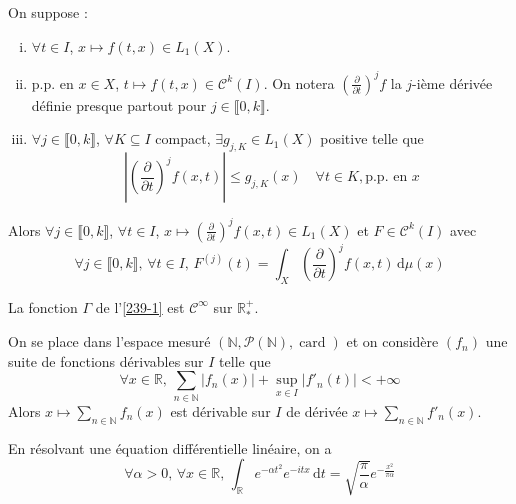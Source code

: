 	\begin{theorem}
		On suppose :
		\begin{enumerate}[(i)]
			\item $\forall t \in I$, $x \mapsto f(t,x) \in L_1(X)$.
			\item p.p. en $x \in X$, $t \mapsto f(t,x) \in \mathcal{C}^k(I)$. On notera $\left(\frac{\partial}{\partial t}\right)^j f$ la $j$-ième dérivée définie presque partout pour $j \in \llbracket 0, k \rrbracket$.
			\item $\forall j \in \llbracket 0, k \rrbracket$, $\forall K \subseteq I$ compact, $\exists g_{j,K} \in L_1(X)$ positive telle que
			\[ \left| \left(\frac{\partial}{\partial t}\right)^j f(x,t) \right| \leq g_{j,K}(x) \quad \forall t \in K, \text{p.p. en } x \]
		\end{enumerate}
		Alors $\forall j \in \llbracket 0, k \rrbracket$, $\forall t \in I$, $x \mapsto \left(\frac{\partial}{\partial t}\right)^j f(x,t) \in L_1(X)$ et $F \in \mathcal{C}^k(I)$ avec
		\[ \forall j \in \llbracket 0, k \rrbracket, \, \forall t \in I, \, F^{(j)}(t) = \int_X \left(\frac{\partial}{\partial t}\right)^j f(x, t) \, \mathrm{d}\mu(x) \]
	\end{theorem}


	\begin{example}
		La fonction $\Gamma$ de l'\cref{239-1} est $\mathcal{C}^\infty$ sur $\mathbb{R}^+_*$.
	\end{example}


	\begin{example}
		On se place dans l'espace mesuré $(\mathbb{N}, \mathcal{P}(\mathbb{N}), \operatorname{card})$ et on considère $(f_n)$ une suite de fonctions dérivables sur $I$ telle que
		\[ \forall x \in \mathbb{R}, \, \sum_{n \in \mathbb{N}} |f_n(x)| + \sup_{x \in I} |f'_n(t)| < +\infty \]
		Alors $x \mapsto \sum_{n \in \mathbb{N}} f_n(x)$ est dérivable sur $I$ de dérivée $x \mapsto \sum_{n \in \mathbb{N}} f'_n(x)$.
	\end{example}


	\begin{application}
		En résolvant une équation différentielle linéaire, on a
		\[ \forall \alpha > 0, \, \forall x \in \mathbb{R}, \, \int_{\mathbb{R}} e^{-\alpha t^2} e^{-itx} \, \mathrm{d}t = \sqrt{\frac{\pi}{\alpha}} e^{-\frac{x^2}{\pi \alpha}} \]
	\end{application}

